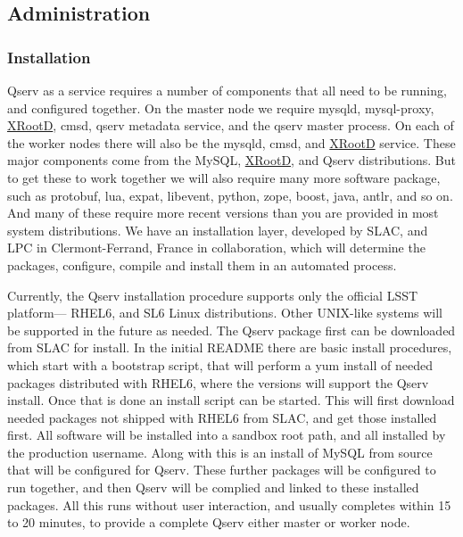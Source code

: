 \documentclass[DM,lsstdraft,toc]{lsstdoc}
\begin{document}
\subsection{Administration}\label{administration}

\subsubsection{Installation}\label{installation}

Qserv as a service requires a number of components that all need to be
running, and configured together. On the master node we require mysqld,
mysql-proxy, \href{http://xrootd.org}{XRootD}, cmsd, qserv metadata
service, and the qserv master process. On each of the worker nodes there
will also be the mysqld, cmsd, and \href{http://xrootd.org}{XRootD}
service. These major components come from the MySQL,
\href{http://xrootd.org}{XRootD}, and Qserv distributions. But to get
these to work together we will also require many more software package,
such as protobuf, lua, expat, libevent, python, zope, boost, java,
antlr, and so on. And many of these require more recent versions than
you are provided in most system distributions. We have an installation
layer, developed by SLAC, and LPC in Clermont-Ferrand, France in
collaboration, which will determine the packages, configure, compile and
install them in an automated process.

Currently, the Qserv installation procedure supports only the official
LSST platform--- RHEL6, and SL6 Linux distributions. Other UNIX-like
systems will be supported in the future as needed. The Qserv package
first can be downloaded from SLAC for install. In the initial README
there are basic install procedures, which start with a bootstrap script,
that will perform a yum install of needed packages distributed with
RHEL6, where the versions will support the Qserv install. Once that is
done an install script can be started. This will first download needed
packages not shipped with RHEL6 from SLAC, and get those installed
first. All software will be installed into a sandbox root path, and all
installed by the production username. Along with this is an install of
MySQL from source that will be configured for Qserv. These further
packages will be configured to run together, and then Qserv will be
complied and linked to these installed packages. All this runs without
user interaction, and usually completes within 15 to 20 minutes, to
provide a complete Qserv either master or worker node.
\end{document}

